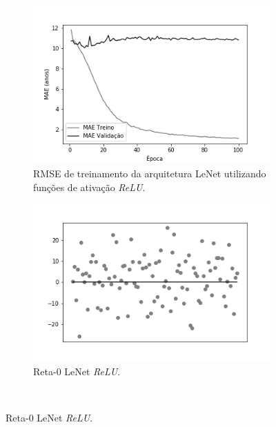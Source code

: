 	\begin{figure}[hb!]
		\caption{Resultados do treinamento e teste da CNN LeNet.}\label{fig:lenet-abordagem1}
		\begin{subfigure}[hb]{0.5\linewidth}
			\caption{RMSE de treinamento da arquitetura LeNet utilizando funções de ativação \emph{ReLU}.}
			\label{fig:redeneuralbiologica}
			\includegraphics[width=\linewidth]{img/graficos/history/lenet/fig-history-abordagem-5-lenet-relu-mae.png}%
		\end{subfigure}%
		\begin{subfigure}[hb]{0.5\linewidth}
			\caption{Reta-0 LeNet \emph{ReLU}.}
			\label{fig:redeneuralbiologica}
			\includegraphics[width=\linewidth]{img/graficos/reta0/lenet/fig-reta-0-abordagem-5-lenet-relu.png}%
		\end{subfigure}\\
	\end{figure}

